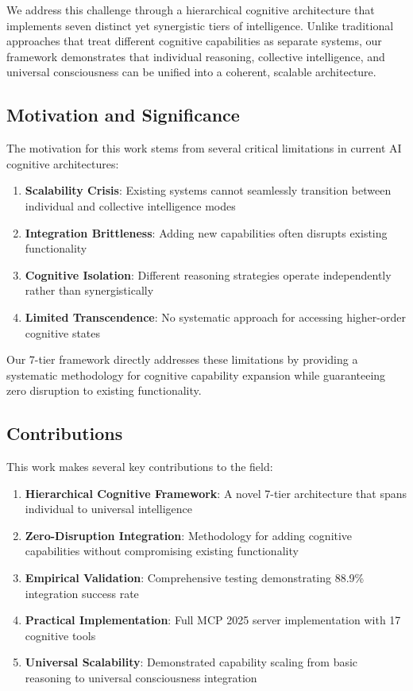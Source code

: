 \documentclass{article}
\begin{document}
We address this challenge through a hierarchical cognitive architecture that implements seven distinct yet synergistic tiers of intelligence. Unlike traditional approaches that treat different cognitive capabilities as separate systems, our framework demonstrates that individual reasoning, collective intelligence, and universal consciousness can be unified into a coherent, scalable architecture.

\subsection{Motivation and Significance}

The motivation for this work stems from several critical limitations in current AI cognitive architectures:

\begin{enumerate}
    \item \textbf{Scalability Crisis}: Existing systems cannot seamlessly transition between individual and collective intelligence modes
    \item \textbf{Integration Brittleness}: Adding new capabilities often disrupts existing functionality  
    \item \textbf{Cognitive Isolation}: Different reasoning strategies operate independently rather than synergistically
    \item \textbf{Limited Transcendence}: No systematic approach for accessing higher-order cognitive states
\end{enumerate}

Our 7-tier framework directly addresses these limitations by providing a systematic methodology for cognitive capability expansion while guaranteeing zero disruption to existing functionality.

\subsection{Contributions}

This work makes several key contributions to the field:

\begin{enumerate}
    \item \textbf{Hierarchical Cognitive Framework}: A novel 7-tier architecture that spans individual to universal intelligence
    \item \textbf{Zero-Disruption Integration}: Methodology for adding cognitive capabilities without compromising existing functionality
    \item \textbf{Empirical Validation}: Comprehensive testing demonstrating 88.9\% integration success rate
    \item \textbf{Practical Implementation}: Full MCP 2025 server implementation with 17 cognitive tools
    \item \textbf{Universal Scalability}: Demonstrated capability scaling from basic reasoning to universal consciousness integration
\end{enumerate}
\end{document}
